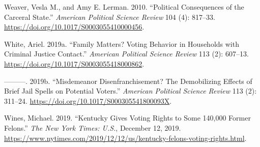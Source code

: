 \documentclass[
  12pt,
]{article}
\newlength{\cslhangindent}
\newenvironment{cslreferences}%
  {\setlength{\parindent}{0pt}%
  \everypar{\setlength{\hangindent}{\cslhangindent}}\ignorespaces}%
  {\par}
\begin{document}
\begin{cslreferences}
\leavevmode\hypertarget{ref-Weaver2010}{}%
Weaver, Vesla M., and Amy E. Lerman. 2010. ``Political Consequences of the Carceral State.'' \emph{American Political Science Review} 104 (4): 817--33. \url{https://doi.org/10.1017/S0003055410000456}.

\leavevmode\hypertarget{ref-White2019a}{}%
White, Ariel. 2019a. ``Family Matters? Voting Behavior in Households with Criminal Justice Contact.'' \emph{American Political Science Review} 113 (2): 607--13. \url{https://doi.org/10.1017/S0003055418000862}.

\leavevmode\hypertarget{ref-White2019}{}%
---------. 2019b. ``Misdemeanor Disenfranchisement? The Demobilizing Effects of Brief Jail Spells on Potential Voters.'' \emph{American Political Science Review} 113 (2): 311--24. \url{https://doi.org/10.1017/S000305541800093X}.

\leavevmode\hypertarget{ref-Wines2019}{}%
Wines, Michael. 2019. ``Kentucky Gives Voting Rights to Some 140,000 Former Felons.'' \emph{The New York Times: U.S.}, December 12, 2019. \url{https://www.nytimes.com/2019/12/12/us/kentucky-felons-voting-rights.html}.
\end{cslreferences}
\end{document}
